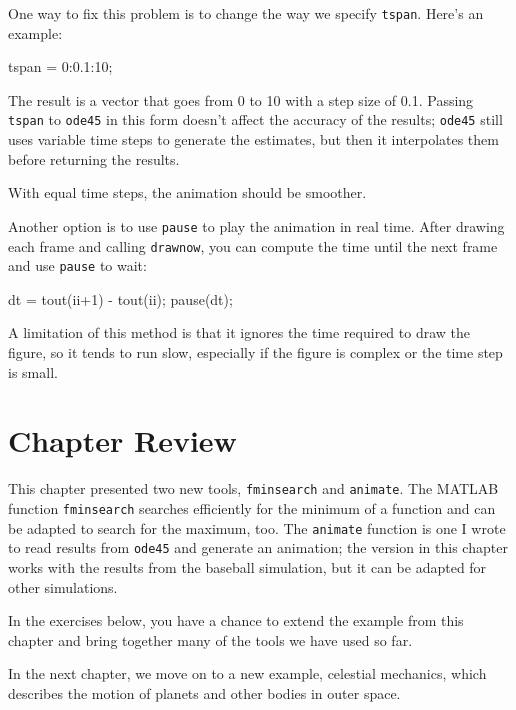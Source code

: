 \documentclass[../../book.tex]{subfiles}
\begin{document}

One way to fix this problem is to change the way we specify \lstinline{tspan}.
Here's an example:

\begin{code}
    tspan = 0:0.1:10;
\end{code}

The result is a vector that goes from 0 to 10 with a step size of 0.1.
Passing \lstinline{tspan} to \lstinline{ode45} in this form doesn't affect the accuracy of the results;
\lstinline{ode45} still uses variable time steps to generate the estimates, but then it interpolates them before returning the results.


With equal time steps, the animation should be smoother.

Another option is to use \lstinline{pause} to play the animation in
real time.  After drawing each frame and calling
\lstinline{drawnow}, you can compute the time
until the next frame and use \lstinline{pause} to wait:

\begin{code}
    dt = tout(ii+1) - tout(ii);
    pause(dt);
\end{code}

A limitation of this method is that it ignores the time required to
draw the figure, so it tends to run slow, especially if the figure is
complex or the time step is small.

\section{Chapter Review}

This chapter presented two new tools, \lstinline{fminsearch} and \lstinline{animate}.
The MATLAB function \lstinline{fminsearch} searches efficiently for the minimum of a function and can be adapted to search for the maximum, too.
The \lstinline{animate} function is one I wrote to read results from \lstinline{ode45} and generate an animation; the version in this chapter works with the results from the baseball simulation, but it can be adapted for other simulations.

In the exercises below, you have a chance to extend the example from this chapter and bring together many of the tools we have used so far.

In the next chapter, we move on to a new example, celestial mechanics, which describes the motion of planets and other bodies in outer space.
\end{document}
